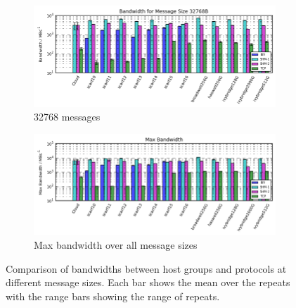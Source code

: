 \documentclass{article}
\begin{document}
             \begin{figure}[H]\ContinuedFloat
                \centering
                \begin{subfigure}{\textwidth}
                  \centering
                    \includegraphics[width=\textwidth]{compare_bandwidth-hostgroup_32768}
                  \caption{32768\si{\byte} messages}
                \end{subfigure}

                \begin{subfigure}{\textwidth}
                  \centering
                    \includegraphics[width=\textwidth]{compare_bandwidth-hostgroup_max}

                  \caption{Max bandwidth over all message sizes}
                \end{subfigure}
                \caption{Comparison of bandwidths between host groups and protocols at different message sizes. Each bar shows the mean over the repeats with the range bars showing the range of repeats.}
                \label{fig:compare_bandwidth-hostgroup_max}
             \end{figure}
\end{document}
